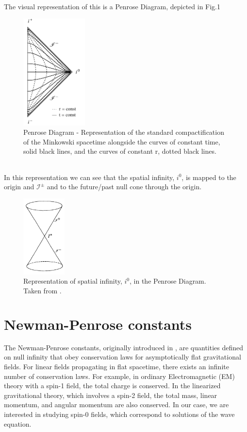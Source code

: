 The visual representation of this is a Penrose Diagram, depicted in Fig.1
\begin{figure}[h]
	\centering \includegraphics[width =0.3\textwidth]{Penrose diagram.pdf}
    \caption{Penrose Diagram - Representation of the standard
      compactification of the Minkowski spacetime alongside the curves of constant
      time, solid black lines, and the curves of constant r, dotted
      black lines.}
\end{figure}
\\
In this representation we can see that the spatial infinity, $i^0$, is mapped to the origin and $\mathscr{I}^{\pm}$ and to the future/past null cone through the origin.\\
\begin{figure}[h!]
	\centering \includegraphics[width =0.2\textwidth]{spatial infinity.jpeg}
    \caption{Representation of spatial infinity, $i^0$, in the Penrose Diagram.\\ Taken from \cite{Ste91}.}
\end{figure}
\section{Newman-Penrose constants}
\label{section:Newman-Penrose Constants}
The Newman-Penrose constants, originally introduced in \cite{NewPen68}, are quantities defined on null infinity that obey conservation laws for asymptotically flat gravitational fields. For linear fields propagating in flat spacetime, there exists an infinite number of conservation laws. For example, in ordinary Electromagnetic (EM) theory with a spin-1 field, the total charge is conserved. In the linearized gravitational theory, which involves a spin-2 field, the total mass, linear momentum, and angular momentum are also conserved. In our case, we are interested in studying spin-0 fields, which correspond to solutions of the wave equation.

